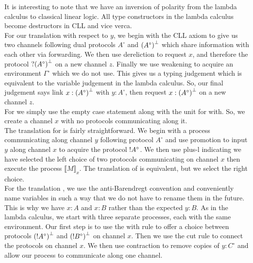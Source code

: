 \noindent
It is interesting to note that we have an inversion of polarity from the lambda calculus 
to classical linear logic. All type constructors in the lambda calculus become destructors 
in CLL and vice verca. \\ %

\noindent
For our translation  with respect to $y$, we begin with the CLL axiom to  
give us two channels following dual protocols $A^\circ$ and $\negg{(A^\circ)}$ which 
share information with each other via forwarding. We then use 
dereliction to request $x$, and therefore the protocol $\whynot \negg{(A^\circ)}$ 
on a new channel $z$. Finally we use weakening to acquire an environment $\Gamma^\circ$ 
which we do not use. This gives us a typing judgement which is equivalent to the variable 
judgement in the lambda calculus. So, our final judgement says link 
$x: \negg{(A^\circ)}$ with $y: A^\circ$, then request $x: \negg{(A^\circ)}$ on a new channel $z$. \\

\noindent
For  we simply use the empty case statement along with the unit for with. 
So, we create a channel $x$ with no protocols communicating along it. \\

\noindent
The translation for  is fairly straightforward. We begin with a process communicating 
along channel $y$ following protocol $A^\circ$ and use promotion to input $y$ along channel $x$ to 
acquire the protocol $\textrm{!} A^\circ$. We then use plus-l indicating we have selected the left choice of 
two protocols communicating on channel $x$ then execute the process $\llbracket M \rrbracket_x$. 
The translation of  is equivalent, but we select the right choice. \\

\noindent
For the translation , we use the anti-Barendregt convention and conveniently 
name variables in such a way that we do not have to rename them in the future. This is why 
we have $x: A$ and $x: B$ rather than the expected $y: B$. As in the 
lambda calculus, we start with three separate processes, each with the same environment. Our 
first step is to use the with rule to offer a choice between protocols $\negg{(\ofc A^\circ)}$ and 
$\negg{(\ofc B^\circ)}$ on channel $x$. Then we use the cut rule to connect the protocols on channel 
$x$. We then use contraction to remove copies of $y: C^\circ$ 
and allow our process to communicate along one channel. \\

